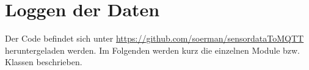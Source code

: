 \section{Loggen der Daten}
Der Code befindet sich unter \href{https://github.com/soerman/sensordataToMQTT}{https://github.com/soerman/sensordataToMQTT} heruntergeladen werden. Im Folgenden werden kurz die einzelnen Module bzw. Klassen beschrieben.

